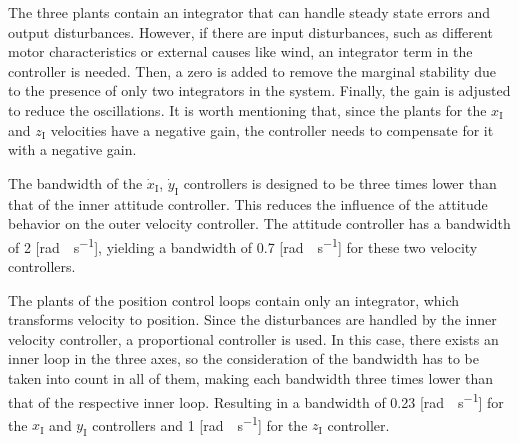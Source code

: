 
The three plants contain an integrator that can handle steady state errors and output disturbances. However, if there are input disturbances, such as different motor characteristics or external causes like wind, an integrator term in the controller is needed. Then, a zero is added to remove the marginal stability due to the presence of only two integrators in the system. Finally, the gain is adjusted to reduce the oscillations. It is worth mentioning that, since the plants for the $x_{\mathrm{I}}$ and $z_{\mathrm{I}}$ velocities have a negative gain, the controller needs to compensate for it with a negative gain.

The bandwidth of the $\dot{x}_{\mathrm{I}}$, $\dot{y}_{\mathrm{I}}$ controllers is designed to be three times lower than that of the inner attitude controller. This reduces the influence of the attitude behavior on the outer velocity controller. The attitude controller has a bandwidth of 2 [\si{rad \cdot s^{-1}}], yielding a bandwidth of 0.7 [\si{rad \cdot s^{-1}}] for these two velocity controllers.



The plants of the position control loops contain only an integrator, which transforms velocity to position. Since the disturbances are handled by the inner velocity controller, a proportional controller is used. In this case, there exists an inner loop in the three axes, so the consideration of the bandwidth has to be taken into count in all of them, making each bandwidth three times lower than that of the respective inner loop. Resulting in a bandwidth of 0.23 [\si{rad \cdot s^{-1}}] for the $x_{\mathrm{I}}$ and $y_{\mathrm{I}}$ controllers and 1 [\si{rad\cdot s^{-1}}] for the $z_{\mathrm{I}}$ controller.

